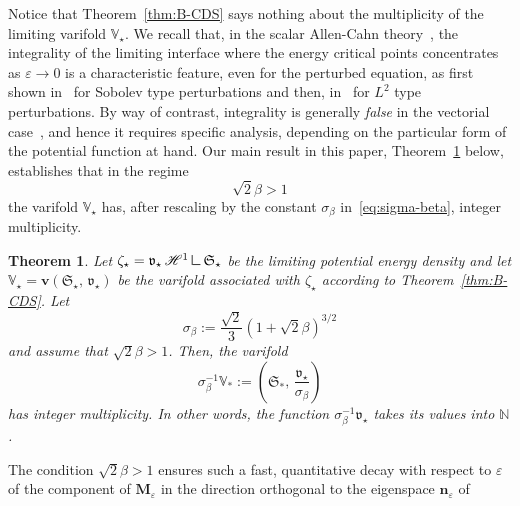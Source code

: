 \documentclass[a4paper, 11pt, twoside, leqno]{article}
\newtheorem{theorem}{Theorem}           %
\theoremstyle{definition}              %
\theoremstyle{remark}                  %
\DeclareMathOperator{\spt}{spt}                                     %
\newcommand{\M}{\mathbf{M}}
\newcommand{\n}{\mathbf{n}}
\renewcommand{\H}{\mathscr{H}}
\newcommand{\eps}{\varepsilon}
\newcommand{\bbV}{\mathbb{V}}
\renewcommand{\v}{\mathbf{v}}
\newcommand{\mres}{\mathbin{\vrule height 1.6ex depth 0pt width
0.13ex\vrule height 0.13ex depth 0pt width 1.3ex}}
\begin{document}
Notice that Theorem~\ref{thm:B-CDS} says nothing about the multiplicity of the 
limiting varifold $\mathbb{V}_\star$. 
We recall that, in the scalar Allen-Cahn theory~\cite{HutchinsonTonegawa}, the 
integrality of the limiting interface where the energy critical points concentrates 
as $\eps \to 0$ is a characteristic feature, even for the 
perturbed equation, as first shown in~\cite{Tonegawa,Tonegawa2005} for Sobolev type perturbations and then, in~\cite{NagaseTonegawa,RogerSchatzle} for $L^2$ type perturbations. 
By way of contrast, integrality is generally 
\emph{false} in the vectorial case~\cite{B, B-Cetraro}, and hence 
it requires specific analysis, depending on the particular form of the 
potential function at hand. 
Our main result in this paper, Theorem~\ref{mainthm:integrality} below,  
establishes that in the regime 
\[
	\sqrt{2}\beta > 1 
\] 
the varifold $\mathbb{V}_\star$ has, after rescaling by the constant $\sigma_\beta$ 
in~\eqref{eq:sigma-beta}, integer multiplicity. 
\begin{theorem}\label{mainthm:integrality}
    Let $\zeta_\star = \mathfrak{v}_\star\,\H^1 \mres \mathfrak{S}_\star$ 
    be the limiting potential energy density and let 
    $\bbV_\star = \v(\mathfrak{S}_\star,\,\mathfrak{v}_\star)$ be the 
    varifold associated with $\zeta_\star$ according to Theorem~\ref{thm:B-CDS}. 
    Let 
    \begin{equation}\label{eq:sigma-beta}
        \sigma_\beta := \frac{\sqrt{2}}{3}\left( 1 + \sqrt{2}\beta \right)^{3/2}
    \end{equation}
    and assume that $\sqrt{2}\beta > 1$. %
    Then, the varifold 
    \[
    	\sigma_\beta^{-1} \bbV_* := \left( \mathfrak{S_*},\,\frac{\mathfrak{v}_\star}{ \sigma_\beta} \right)
    \]
    has integer multiplicity. In other words, the function $\sigma_\beta^{-1}\mathfrak{v}_\star$ takes its values into $\mathbb{N}$.
\end{theorem}
The condition $\sqrt{2}\beta > 1$ ensures such a fast, quantitative decay
with respect to $\eps$ of the 
component of $\M_\eps$ in the direction orthogonal to the eigenspace $\n_\eps$ of 
\end{document}
